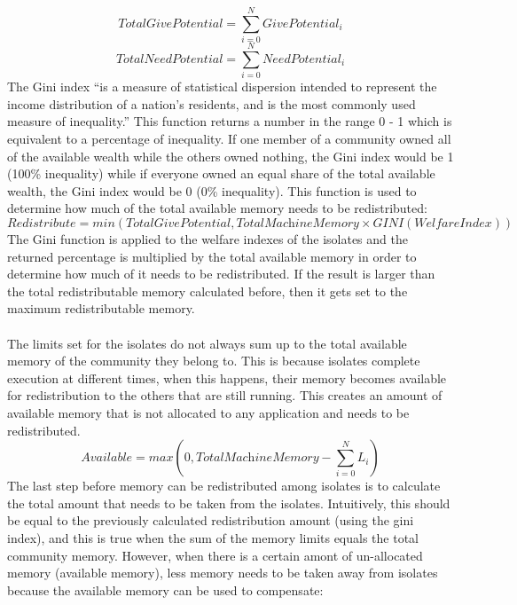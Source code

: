 \documentclass{l4proj}
\begin{document}
\begin{equation}
\textit{TotalGivePotential} = \sum_{i=0}^{N}\textit{GivePotential}_i
\end{equation}
\begin{equation}
\textit{TotalNeedPotential} = \sum_{i=0}^{N}\textit{NeedPotential}_i
\end{equation}
The Gini index ``is a measure of statistical dispersion intended to represent the income distribution of a nation's residents, and is the most commonly used measure of inequality.''\cite{gini} This function returns a number in the range 0 - 1 which is equivalent to a percentage of inequality. If one member of a community owned all of the available wealth while the others owned nothing, the Gini index would be 1 (100\% inequality) while if everyone owned an equal share of the total available wealth, the Gini index would be 0 (0\% inequality). This function is used to determine how much of the total available memory needs to be redistributed:
\begin{equation}
\textit{Redistribute} = min(TotalGivePotential,\textit{TotalMachineMemory} \times \textit{GINI}(\textit{WelfareIndex}))
\end{equation}
The Gini function is applied to the welfare indexes of the isolates and the returned percentage is multiplied by the total available memory in order to determine how much of it needs to be redistributed. If the result is larger than the total redistributable memory calculated before, then it gets set to the maximum redistributable memory.
\\\\
The limits set for the isolates do not always sum up to the total available memory of the community they belong to. This is because isolates complete execution at different times, when this happens, their memory becomes available for redistribution to the others that are still running. This creates an amount of available memory that is not allocated to any application and needs to be redistributed.
\begin{equation}
\textit{Available} = max(0,\textit{TotalMachineMemory} - \sum_{i=0}^{N}L_i)
\end{equation}
The last step before memory can be redistributed among isolates is to calculate the total amount that needs to be taken from the isolates. Intuitively, this should be equal to the previously calculated redistribution amount (using the gini index), and this is true when the sum of the memory limits equals the total community memory. However, when there is a certain amont of un-allocated memory (available memory), less memory needs to be taken away from isolates because the available memory can be used to compensate:  
\end{document}
